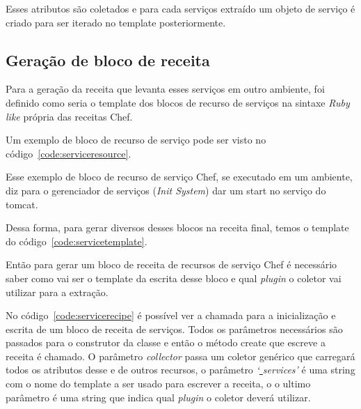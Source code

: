Esses atributos são coletados e para cada serviços extraído um objeto de serviço
é criado para ser iterado no template posteriormente.

\subsection{Geração de bloco de receita}
Para a geração da receita que levanta esses serviços em outro ambiente, foi 
definido como seria o template dos blocos de recurso de serviços na sintaxe 
\textit{Ruby like} própria das receitas Chef.

Um exemplo de bloco de recurso de serviço pode ser visto no código~\ref{code:serviceresource}.

\noindent\begin{minipage}{\textwidth}
  
\end{minipage}\hfill

Esse exemplo de bloco de recurso de serviço Chef, se executado em um ambiente, diz para o
gerenciador de serviços (\textit{Init System}) dar um start no serviço do tomcat.

Dessa forma, para gerar diversos desses blocos na receita final, temos o template
do código~\ref{code:servicetemplate}.

\noindent\begin{minipage}{\textwidth}
  
\end{minipage}\hfill

Então para gerar um bloco de receita de recursos de serviço Chef é necessário
saber como vai ser o template da escrita desse bloco e qual \textit{plugin} o
coletor vai utilizar para a extração.

No código~\ref{code:servicerecipe} é possível ver a chamada para a inicialização e escrita de um
bloco de receita de serviços. Todos os parâmetros necessários são passados para
o construtor da classe e então o método create que escreve a receita é chamado.
O parâmetro \textit{collector} passa um coletor genérico que carregará todos os
atributos desse e de outros recursos, o parâmetro \textit{`\underline{ }services'} é uma
string com o nome do template a ser usado para escrever a receita, o o ultimo
parâmetro é uma string que indica qual \textit{plugin} o coletor deverá utilizar.

